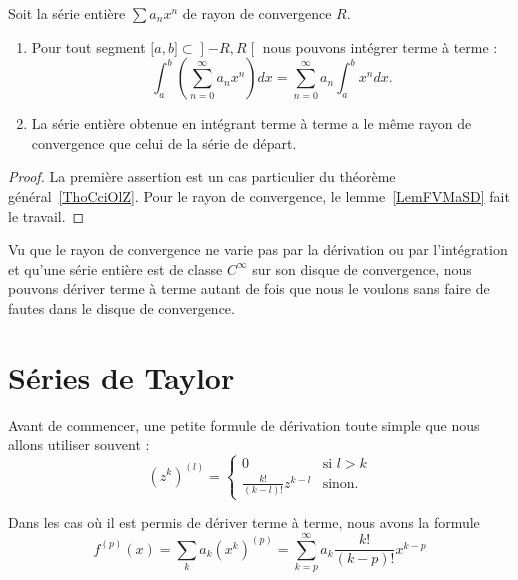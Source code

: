 \begin{proposition} \label{PropfeFQWr}
	Soit la série entière \( \sum a_nx^n\) de rayon de convergence \( R\).
	\begin{enumerate}
		\item
		      Pour tout segment \( \mathopen[ a , b \mathclose]\subset\mathopen] -R , R \mathclose[\) nous pouvons intégrer terme à terme :
		      \begin{equation}
			      \int_a^b\left( \sum_{n=0}^{\infty}a_nx^n\right)dx=\sum_{n=0}^{\infty}a_n\int_a^bx^ndx.
		      \end{equation}
		\item
		      La série entière obtenue en intégrant terme à terme a le même rayon de convergence que celui de la série de départ.
	\end{enumerate}
\end{proposition}

\begin{proof}
	La première assertion est un cas particulier du théorème général~\ref{ThoCciOlZ}. Pour le rayon de convergence, le lemme~\ref{LemFVMaSD} fait le travail.
\end{proof}

Vu que le rayon de convergence ne varie pas par la dérivation ou par l'intégration et qu'une série entière est de classe \(  C^{\infty}\) sur son disque de convergence, nous pouvons dériver terme à terme autant de fois que nous le voulons sans faire de fautes dans le disque de convergence.

\section{Séries de Taylor}
\label{SECooDWRMooUKSuPh}

\begin{normaltext}
	Avant de commencer, une petite formule de dérivation toute simple que nous allons utiliser souvent :
	\begin{equation}        \label{EqSOFdwhw}
		(z^k)^{(l)}=\begin{cases}
			0                            & \text{si } l>k \\
			\frac{ k! }{ (k-l)! }z^{k-l} & \text{sinon.}
		\end{cases}
	\end{equation}

	Dans les cas où il est permis de dériver terme à terme, nous avons la formule
	\begin{equation}        \label{EQooTNOMooJZClvE}
		f^{(p)}(x)=\sum_ka_k(x^k)^{(p)}=\sum_{k=p}^{\infty}a_k\frac{ k! }{ (k-p)! }x^{k-p}
	\end{equation}
\end{normaltext}



